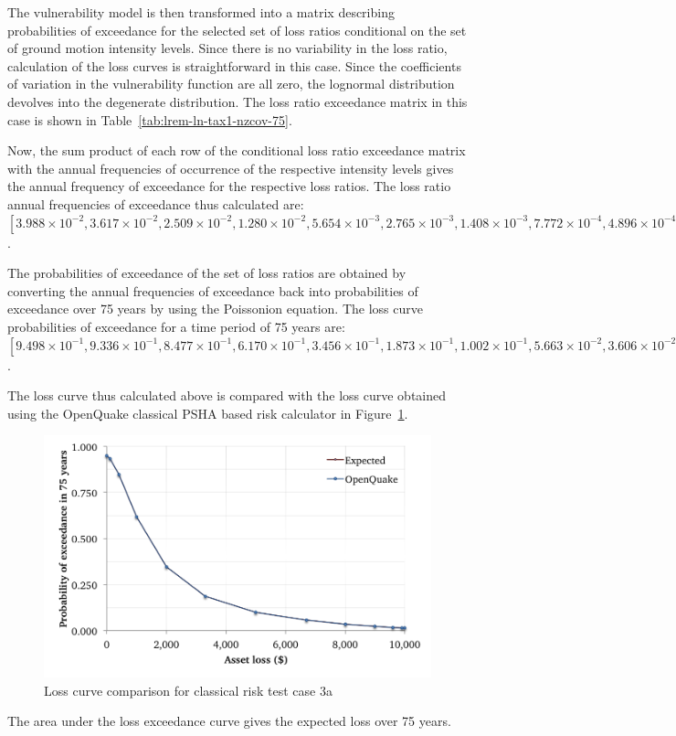 The vulnerability model is then transformed into a matrix describing probabilities of exceedance for the selected set of loss ratios conditional on the set of ground motion intensity levels. Since there is no variability in the loss ratio, calculation of the loss curves is straightforward in this case. Since the coefficients of variation in the vulnerability function are all zero, the lognormal distribution devolves into the degenerate distribution. The loss ratio exceedance matrix in this case is shown in Table~\ref{tab:lrem-ln-tax1-nzcov-75}.



Now, the sum product of each row of the conditional loss ratio exceedance matrix with the annual frequencies of occurrence of the respective intensity levels gives the annual frequency of exceedance for the respective loss ratios. The loss ratio annual frequencies of exceedance thus calculated are: $[3.988\times10^{-2}, 3.617\times10^{-2}, 2.509\times10^{-2}, 1.280\times10^{-2}, 5.654\times10^{-3}, 2.765\times10^{-3}, 1.408\times10^{-3}, 7.772\times10^{-4}, 4.896\times10^{-4}, 3.276\times10^{-4}, 2.457\times10^{-4}, 2.037\times10^{-4}, 1.903\times10^{-4}]$.

The probabilities of exceedance of the set of loss ratios are obtained by converting the annual frequencies of exceedance back into probabilities of exceedance over 75 years by using the Poissonion equation. The loss curve probabilities of exceedance for a time period of 75 years are: $[9.498\times10^{-1}, 9.336\times10^{-1}, 8.477\times10^{-1}, 6.170\times10^{-1}, 3.456\times10^{-1}, 1.873\times10^{-1}, 1.002\times10^{-1}, 5.663\times10^{-2}, 3.606\times10^{-2}, 2.427\times10^{-2}, 1.826\times10^{-2}, 1.516\times10^{-2}, 1.417\times10^{-2}]$.

The loss curve thus calculated above is compared with the loss curve obtained using the OpenQuake classical PSHA based risk calculator in Figure~\ref{fig:lc-cr-3a}.

\begin{figure}[htbp]
\centering
\includegraphics[width=12cm]{qareport/figures/fig-lc-cr-3a}
\caption{Loss curve comparison for classical risk test case 3a}
\label{fig:lc-cr-3a}
\end{figure}

The area under the loss exceedance curve gives the expected loss over 75 years.
